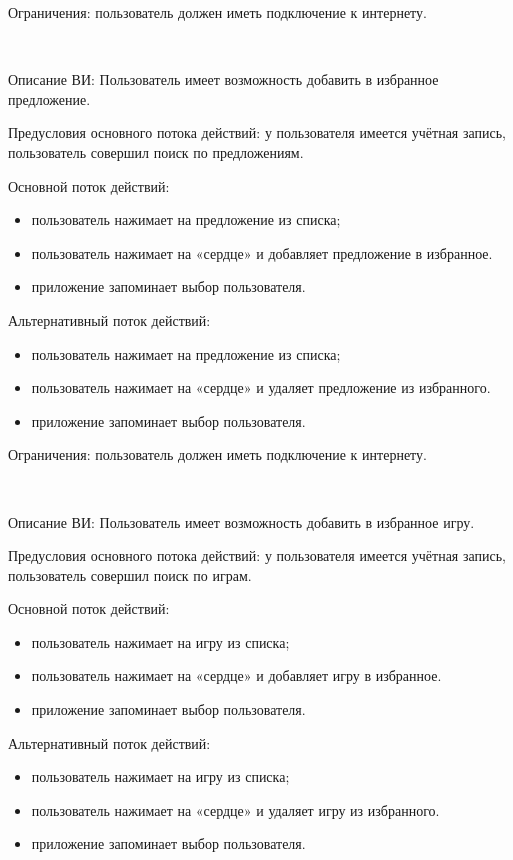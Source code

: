 Ограничения: пользователь должен иметь подключение к интернету.

~\par
\label{use:favoritedeals}
Описание ВИ: Пользователь имеет возможность добавить в избранное предложение.
 
Предусловия основного потока действий: у пользователя имеется учётная запись, пользователь совершил поиск по предложениям.
 
Основной поток действий:
\begin{itemize}
   \item пользователь нажимает на предложение из списка;
   \item пользователь нажимает на «сердце» и добавляет предложение в избранное.
   \item приложение запоминает выбор пользователя.
\end{itemize}

Альтернативный поток действий:
\begin{itemize}
   \item пользователь нажимает на предложение из списка;
   \item пользователь нажимает на «сердце» и удаляет предложение из избранного.
   \item приложение запоминает выбор пользователя.
\end{itemize}

Ограничения: пользователь должен иметь подключение к интернету.

~\par
\label{use:favoritegames}
Описание ВИ: Пользователь имеет возможность добавить в избранное игру.
 
Предусловия основного потока действий: у пользователя имеется учётная запись, пользователь совершил поиск по играм.
 
Основной поток действий:
\begin{itemize}
   \item пользователь нажимает на игру из списка;
   \item пользователь нажимает на «сердце» и добавляет игру в избранное.
   \item приложение запоминает выбор пользователя.
\end{itemize}

Альтернативный поток действий:
\begin{itemize}
   \item пользователь нажимает на игру из списка;
   \item пользователь нажимает на «сердце» и удаляет игру из избранного.
   \item приложение запоминает выбор пользователя.
\end{itemize}

